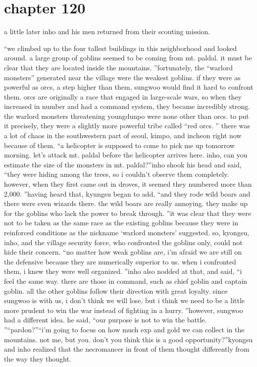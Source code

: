 \section{chapter 120}

                            a little later inho and his men returned from their scouting mission.





“we climbed up to the four tallest buildings in this neighborhood and looked around.
 a large group of goblins seemed to be coming from mt.
 paldal.
 it must be clear that they are located inside the mountains.
”fortunately, the “warlord monsters” generated near the village were the weakest goblins.
if they were as powerful as orcs, a step higher than them, sungwoo would find it hard to confront them.
 orcs are originally a race that engaged in large-scale wars, so when they increased in number and had a command system, they became incredibly strong.
the warlord monsters threatening youngdunpo were none other than orcs.
 to put it precisely, they were a slightly more powerful tribe called “red orcs.
” there was a lot of chaos in the southwestern part of seoul, kimpo, and incheon right now because of them.
“a helicopter is supposed to come to pick me up tomorrow morning.
 let’s attack mt.
 paldal before the helicopter arrives here.
 inho, can you estimate the size of the monsters in mt.
 paldal?”inho shook his head and said, “they were hiding among the trees, so i couldn’t observe them completely.
 however, when they first came out in droves, it seemed they numbered more than 2,000.
”having heard that, kyungsu began to add, “and they rode wild boars and there were even wizards there.
 the wild boars are really annoying.
 they make up for the goblins who lack the power to break through.
”it was clear that they were not to be taken as the same race as the existing goblins because they were in reinforced conditions as the nickname ‘warlord monsters’ suggested.
so, kyongsu, inho, and the village security force, who confronted the goblins only, could not hide their concern.
“no matter how weak goblins are, i’m afraid we are still on the defensive because they are numerically superior to us.
 when i confronted them, i knew they were well organized.
”inho also nodded at that, and said, “i feel the same way.
 there are those in command, such as chief goblin and captain goblin.
 all the other goblins follow their direction with great loyalty.
 since sungwoo is with us, i don’t think we will lose, but i think we need to be a little more prudent to win the war instead of fighting in a hurry.
”however, sungwoo had a different idea.
he said, “our purpose is not to win the battle.
”“pardon?”“i’m going to focus on how much exp and gold we can collect in the mountains.
 not me, but you.
 don’t you think this is a good opportunity?”kyongsu and inho realized that the necromancer in front of them thought differently from the way they thought.


